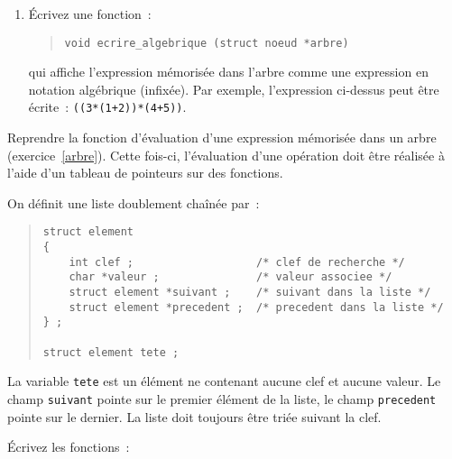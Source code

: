 \begin {enumerate}
	qui renvoie la valeur de l'expression mémorisée dans l'arbre.
	Pour choisir et réaliser une opération, vous utiliserez le choix
	multiple ({\tt switch}) pour sélectionner la fonction {\tt
	ajouter}, {\tt soustraire}, {\tt multiplier} ou {\tt diviser}.
	Ces fonctions prennent les deux opérandes comme arguments et
	renvoient le résultat de l'opération.

    \item Écrivez une fonction~:

\begin {quote}
\begin {verbatim}
void ecrire_algebrique (struct noeud *arbre)
\end{verbatim}
\end {quote}

	qui affiche l'expression mémorisée dans l'arbre comme une
	expression en notation algébrique (infixée). Par exemple,
	l'expression ci-dessus peut être écrite~:
	\verb:((3*(1+2))*(4+5)):.

\end {enumerate}


\question

Reprendre la fonction d'évaluation d'une expression mémorisée dans un
arbre (exercice~\ref {arbre}). Cette fois-ci, 
l'évaluation d'une opération doit être réalisée à l'aide d'un tableau de
pointeurs sur des fonctions.


\question

On définit une liste doublement chaînée par~:

\begin {quote}
\small
\begin {verbatim}
struct element
{
    int clef ;                   /* clef de recherche */
    char *valeur ;               /* valeur associee */
    struct element *suivant ;    /* suivant dans la liste */
    struct element *precedent ;  /* precedent dans la liste */
} ;

struct element tete ;
\end{verbatim}
\end {quote}

La variable {\tt tete} est un élément ne contenant aucune clef et aucune
valeur. Le champ {\tt suivant} pointe sur le premier élément de la
liste, le champ {\tt precedent} pointe sur le dernier. La liste doit
toujours être triée suivant la clef.

Écrivez les fonctions~:


